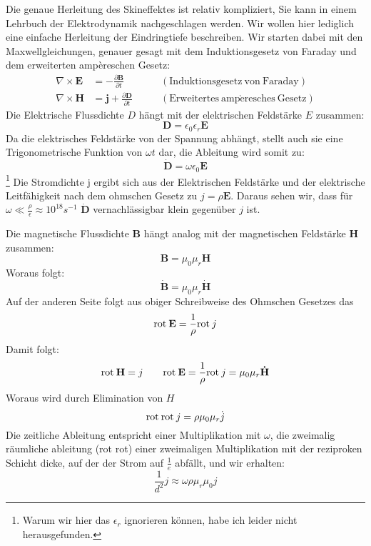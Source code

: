 Die genaue Herleitung des Skineffektes ist relativ kompliziert, Sie kann in einem Lehrbuch der Elektrodynamik nachgeschlagen werden. %
Wir wollen hier lediglich eine einfache Herleitung der Eindringtiefe beschreiben.
Wir starten dabei mit den Maxwellgleichungen, genauer gesagt mit dem Induktionsgesetz von Faraday und dem erweiterten ampèreschen Gesetz:
\begin{align}
\nabla \times \mathbf{E} &= -\frac{\partial \mathbf{B}}{\partial t} \qquad &\mathrm{(Induktionsgesetz\ von\ Faraday)} \\
\nabla \times \mathbf{H} &= \mathbf{j} + \frac{\partial \mathbf{D}}{\partial t} \qquad &\mathrm{(Erweitertes\ amp\grave{e}resches\ Gesetz)}
\end{align}
Die Elektrische Flussdichte $D$ hängt mit der elektrischen Feldstärke $E$ zusammen:
\begin{equation}
\mathbf D = \epsilon_0 \epsilon_r \mathbf{E}
\end{equation}
Da die elektrisches Feldstärke von der Spannung abhängt, stellt auch sie eine Trigonometrische Funktion von $\omega t$ dar, die Ableitung wird somit zu:
\begin{equation}
\mathbf{\dot{D}} = \omega \epsilon_0 \mathbf{E}
\end{equation}\footnote{Warum wir hier das $\epsilon_r$ ignorieren können, habe ich leider nicht herausgefunden.}
Die Stromdichte j ergibt sich aus der Elektrischen Feldstärke und der elektrische Leitfähigkeit nach dem ohmschen Gesetz zu $j = \rho \mathbf E$. Daraus sehen wir, dass für $\omega \ll \frac{\rho}{\epsilon} \approx 10^{18} s^{-1}$ $\mathbf{\dot{D}}$ vernachlässigbar klein gegenüber $j$ ist.

Die magnetische Flussdichte $\mathbf B$ hängt analog mit der magnetischen Feldstärke $\mathbf H$ zusammen:
\begin{equation}
\mathbf B = \mu_0 \mu_r \mathbf H
\end{equation} 
Woraus folgt:
\begin{equation}
\mathbf{\dot{B}} = \mu_0 \mu_r \mathbf{\dot{H}}
\end{equation} 
Auf der anderen Seite folgt aus obiger Schreibweise des Ohmschen Gesetzes das 
\begin{equation}
\mathrm{rot\:} \mathbf E = \frac{1}{\rho} \mathrm{rot\:} j
\end{equation}
Damit folgt:
\begin{equation}
\mathrm{rot\:} \mathbf H = j \qquad
\mathrm{rot\:} \mathbf E = \frac{1}{\rho} \mathrm{rot\:} j = \mu_0 \mu_r \mathbf{\dot{H}}
\end{equation}
Woraus wird durch Elimination von $H$
\begin{equation}
\mathrm{rot\:}\mathrm{rot\:} j = \rho \mu_0 \mu_r \dot{j}
\end{equation}
Die zeitliche Ableitung entspricht einer Multiplikation mit $\omega$, die zweimalig räumliche ableitung (rot rot) einer zweimaligen Multiplikation mit der reziproken Schicht dicke, auf der der Strom auf $\frac{1}{e}$ abfällt, und wir erhalten:
\begin{equation}
\frac{1}{d^2} j \approx \omega \rho \mu_r \mu_0 j
\end{equation}

